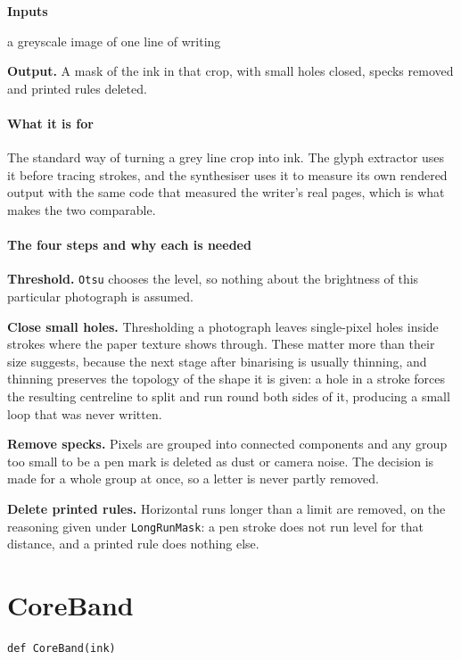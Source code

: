 \noindent\textbf{Inputs}
\begin{description}[leftmargin=2.2em,style=nextline,font=\normalfont\ttfamily]\setlength\itemsep{1pt}
  \item[{gray}] \normalfont a greyscale image of one line of writing
\end{description}

\noindent\textbf{Output.} A mask of the ink in that crop, with small holes closed, specks removed and printed rules deleted.


\paragraph{What it is for}
The standard way of turning a grey line crop into ink. The glyph extractor uses it before tracing strokes, and the synthesiser uses it to measure its own rendered output with the same code that measured the writer's real pages, which is what makes the two comparable.


\paragraph{The four steps and why each is needed}
\textbf{Threshold.} \texttt{Otsu} chooses the level, so nothing about the brightness of this particular photograph is assumed.

\textbf{Close small holes.} Thresholding a photograph leaves single-pixel holes inside strokes where the paper texture shows through. These matter more than their size suggests, because the next stage after binarising is usually thinning, and thinning preserves the topology of the shape it is given: a hole in a stroke forces the resulting centreline to split and run round both sides of it, producing a small loop that was never written.

\textbf{Remove specks.} Pixels are grouped into connected components and any group too small to be a pen mark is deleted as dust or camera noise. The decision is made for a whole group at once, so a letter is never partly removed.

\textbf{Delete printed rules.} Horizontal runs longer than a limit are removed, on the reasoning given under \texttt{LongRunMask}: a pen stroke does not run level for that distance, and a printed rule does nothing else.


\section{CoreBand}
\begin{lstlisting}[style=sig]
def CoreBand(ink)
\end{lstlisting}


